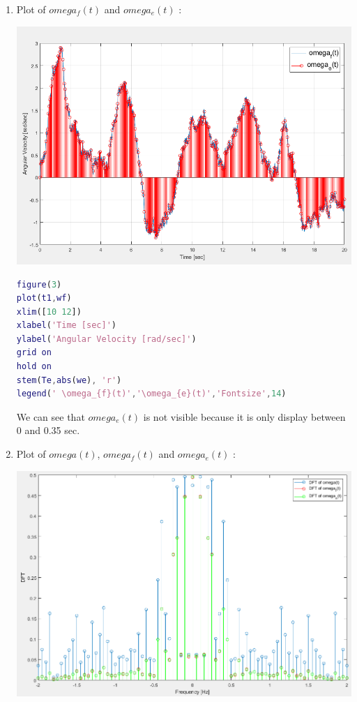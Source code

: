 \documentclass[a4paper,12pt]{article}
\begin{document}
\begin{enumerate}[label={\color{blue}\arabic*)}]
    \item 
    Plot of \(omega_f(t)\) and \(omega_e(t)\) : 
    \begin{multicols}{2}
        \begin{flushleft}
            \includegraphics[width=0.75\linewidth]{Images/Wf_and_We.png}
            \label{Figure6}
        \end{flushleft}

        \columnbreak

        \begin{lstlisting}[style=Matlab-editor,language=Matlab, basicstyle=\small\ttfamily]
figure(3)
plot(t1,wf)
xlim([10 12])
xlabel('Time [sec]')
ylabel('Angular Velocity [rad/sec]')
grid on
hold on
stem(Te,abs(we), 'r')
legend(' \omega_{f}(t)','\omega_{e}(t)','Fontsize',14)
        \end{lstlisting}
    \end{multicols}

    We can see that \(omega_e(t)\) is not visible because it is only display between 0 and 0.35 sec.
    \newpage
    
    \item 
    Plot of \(omega(t)\), \(omega_f(t)\) and \(omega_e(t)\) :
    \begin{multicols}{2}
        \begin{flushleft}
            \includegraphics[width=1\linewidth]{Images/w_wf_weDFT.png}
            \label{Figure6}
        \end{flushleft}


\end{multicols}
\end{enumerate}
\end{document}
